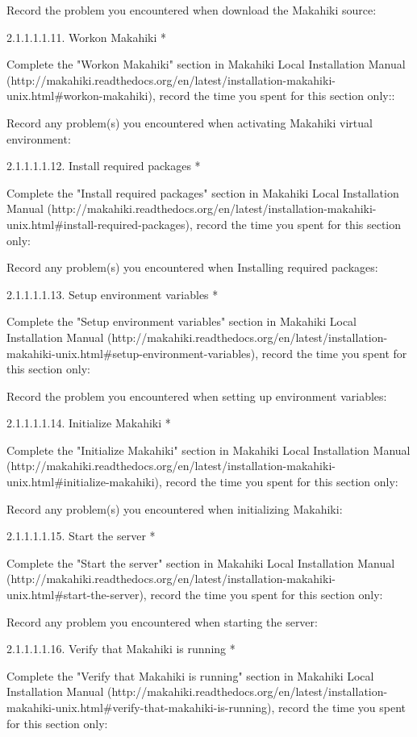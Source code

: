 Record the problem you encountered when download the Makahiki source:

2.1.1.1.1.11. Workon Makahiki *

Complete the "Workon Makahiki" section in Makahiki Local Installation Manual (http://makahiki.readthedocs.org/en/latest/installation-makahiki-unix.html\#workon-makahiki), record the time you spent for this section only::

Record any problem(s) you encountered when activating Makahiki virtual environment:

2.1.1.1.1.12. Install required packages *

Complete the "Install required packages" section in Makahiki Local Installation Manual (http://makahiki.readthedocs.org/en/latest/installation-makahiki-unix.html\#install-required-packages), record the time you spent for this section only:

Record any problem(s) you encountered when Installing required packages:

2.1.1.1.1.13. Setup environment variables *

Complete the "Setup environment variables" section in Makahiki Local Installation Manual (http://makahiki.readthedocs.org/en/latest/installation-makahiki-unix.html\#setup-environment-variables), record the time you spent for this section only:

Record the problem you encountered when setting up environment variables:

2.1.1.1.1.14. Initialize Makahiki *

Complete the "Initialize Makahiki" section in Makahiki Local Installation Manual (http://makahiki.readthedocs.org/en/latest/installation-makahiki-unix.html\#initialize-makahiki), record the time you spent for this section only:

Record any problem(s) you encountered when initializing Makahiki:

2.1.1.1.1.15. Start the server *

Complete the "Start the server" section in Makahiki Local Installation Manual (http://makahiki.readthedocs.org/en/latest/installation-makahiki-unix.html\#start-the-server), record the time you spent for this section only:

Record any problem you encountered when starting the server:

2.1.1.1.1.16. Verify that Makahiki is running *

Complete the "Verify that Makahiki is running" section in Makahiki Local Installation Manual (http://makahiki.readthedocs.org/en/latest/installation-makahiki-unix.html\#verify-that-makahiki-is-running), record the time you spent for this section only:

